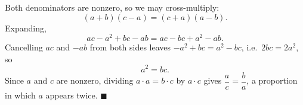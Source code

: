 Both denominators are nonzero, so we may cross-multiply:
\[
(a+b)(c-a)=(c+a)(a-b).
\]
Expanding,
\[
ac-a^2+bc-ab=ac-bc+a^2-ab .
\]
Cancelling $ac$ and $-ab$ from both sides leaves $-a^2+bc=a^2-bc$, i.e.\ $2bc=2a^2$, so
\[
a^2=bc .
\]
Since $a$ and $c$ are nonzero, dividing $a\cdot a=b\cdot c$ by $a\cdot c$ gives $\boxed{\dfrac {a}{c}=\dfrac {b}{a}}$, a proportion in which $a$ appears twice. $\blacksquare$
